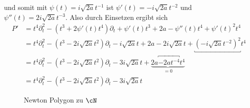 und somit mit $\psi(t)=i\sqrt{2a}t^{-1}$ ist $\psi'(t)=-i\sqrt{2a}t^{-2}$ und
$\psi''(t)=2i\sqrt{2a}t^{-3}$. Also durch Einsetzen ergibt sich
\begin{align*}
P' &= t^4\partial_t^2 - (t^{3} + 2\psi'(t)t^4)\partial_t
    + \psi'(t)t^3 + 2a -\psi''(t)t^4
    + \psi'(t)^2t^4
\\&= t^4\partial_t^2 - (t^{3} - 2i\sqrt{2a}t^{2})\partial_t - i\sqrt{2a}t
    + 2a - 2i\sqrt{2a}t + \underbracket{(-i\sqrt{2a}t^{-2})^2}t^4
\\&= t^4\partial_t^2 - (t^{3} - 2i\sqrt{2a}t^{2})\partial_t - 3i\sqrt{2a}t
  + \underset{=0}{\underbrace{ 2a \overbracket{- 2at^{-4}}t^4 }}
\\&= t^4\partial_t^2 - (t^{3} - 2i\sqrt{2a}t^{2})\partial_t - 3 i\sqrt{2a}t
\end{align*}
\begin{figure}[H]
\caption{Newton Polygon zu $\cN$}
\begin{center}
\end{center}
\end{figure}
\begin{comment}
Alternative berechnung: mit Formel aus \cite[Seite 44]{DiplHedwig}
\[
P'(t,\partial_t)=\rho^*P(t,\partial_t-\frac{\partial \psi}{\partial t})
\]
es ist $\rho^*P(t,\partial_t)=t^4\partial_t^2-t^3\partial_t+2a$, und somit 
\begin{align*}
P'(t,\partial_t) &= \rho^*P(t,\partial_t-\frac{\partial \psi}{\partial t}) 
\\&=\rho^*P(t,\partial_t-\frac{-i\sqrt{2a}}{t^2}) 
\\&= t^4\underbracket{(\partial_t+\frac{i\sqrt{2a}}{t^2})^2}
    \underbracket{- t^3(\partial_t+\frac{i\sqrt{2a}}{t^2})} + 2a
\\&= t^4 \overbracket{\underbracket{
      (\partial_t+i\sqrt{2a}t^{-2})(\partial_t+i\sqrt{2a}t^{-2})
    }} \overbracket{ - t^3\partial_t - i\sqrt{2a}t} + 2a
\\&= t^4 \overbracket{ (\partial_t^2 + i\sqrt{2a}t^{-2}\partial_t
      +\partial_ti\sqrt{2a}t^{-2} + \underbracket{(i\sqrt{2a}t^{-2})^2)}
    } - t^3\partial_t - i\sqrt{2a}t + 2a
\\&= t^4\partial_t^2 + i\sqrt{2a}t^{2}\partial_t
    + i\sqrt{2a}t^4\underbracket{\partial_tt^{-2}} \overbracket{-2at^{-4}}t^4
    - t^3\partial_t
    - i\sqrt{2a}t + 2a
\\&= t^4\partial_t^2 + i\sqrt{2a}t^{2}\partial_t
    + i\sqrt{2a}t^4\overbracket{(t^{-2}\partial_t-2t^{-3})} - t^3\partial_t
    - i\sqrt{2a}t
\\&= t^4\partial_t^2 + i\sqrt{2a}t^{2}\partial_t + i\sqrt{2a}t^2\partial_t
    - 2i\sqrt{2a}t - t^3\partial_t - i\sqrt{2a}t
\\&= t^4\partial_t^2 - (t^3-2i\sqrt{2a}t^{2})\partial_t - 3i\sqrt{2a}t
\end{align*}
\end{comment}

